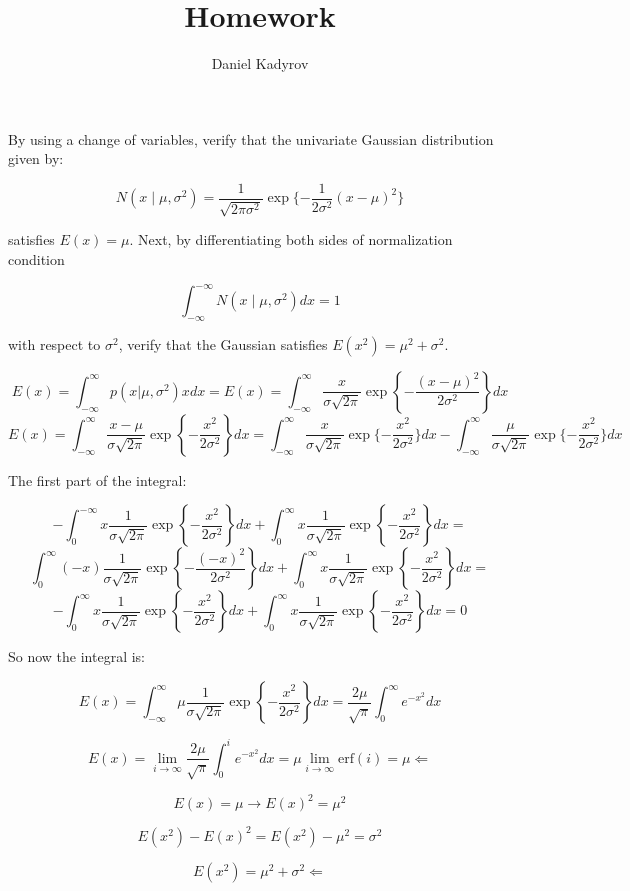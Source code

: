\documentclass{homework}
\title{Homework}
\author{Daniel Kadyrov}
\begin{document}
\maketitle

\begin{problem}[1]
    By using a change of variables, verify that the univariate Gaussian distribution given by:

    $$
    N(x \mid \mu , \sigma^2) = \frac{1}{\sqrt{2\pi\sigma^2}}\exp\{
        -\frac{1}{2\sigma^2}(x-\mu)^2
        \}
    $$

    satisfies $E(x) = \mu$. Next, by differentiating both sides of normalization condition

    $$
    \int_{-\infty}^{-\infty}N(x \mid \mu, \sigma^2) dx = 1
    $$

    with respect to $\sigma^2$, verify that the Gaussian satisfies $E(x^2)=\mu^2+\sigma^2$.
\end{problem}

\begin{solution}
    $$
    E(x) = \int_{-\infty}^{\infty} p(x|\mu, \sigma^2)x dx = E(x) = \int_{-\infty}^{\infty} \frac{x}{\sigma\sqrt{2\pi}}\exp\left\{-\frac{(x-\mu)^2}{2\sigma^2}\right\} dx
    $$
    $$
    E(x) = \int_{-\infty}^{\infty} \frac{x-\mu}{\sigma\sqrt{2\pi}}\exp\left\{-\frac{x^2}{2\sigma^2}\right\} dx = 
    \int_{-\infty}^{\infty} \frac{x}{\sigma\sqrt{2\pi}}\exp\{-\frac{x^2}{2\sigma^2}\} dx -
    \int_{-\infty}^{\infty} \frac{\mu}{\sigma\sqrt{2\pi}}\exp\{-\frac{x^2}{2\sigma^2}\} dx
    $$

    The first part of the integral: 

    $$ 
    -\int_{0}^{-\infty}x\frac{1}{\sigma\sqrt{2\pi}}\exp\left\{-\frac{x^2}{2\sigma^2}\right\}dx + \int_{0}^{\infty}x\frac{1}{\sigma\sqrt{2\pi}}\exp\left\{-\frac{x^2}{2\sigma^2}\right\}dx = 
    $$
    $$\int_{0}^{\infty}(-x)\frac{1}{\sigma\sqrt{2\pi}}\exp\left\{-\frac{(-x)^2}{2\sigma^2}\right\}dx + \int_{0}^{\infty}x\frac{1}{\sigma\sqrt{2\pi}}\exp\left\{-\frac{x^2}{2\sigma^2}\right\}dx =
    $$
    $$
    -\int_{0}^{\infty}x\frac{1}{\sigma\sqrt{2\pi}}\exp\left\{-\frac{x^2}{2\sigma^2}\right\}dx + \int_{0}^{\infty}x\frac{1}{\sigma\sqrt{2\pi}}\exp\left\{-\frac{x^2}{2\sigma^2}\right\}dx = 0
    $$

    So now the integral is: 

    $$
    E(x) = \int_{-\infty}^{\infty}\mu\frac{1}{\sigma\sqrt{2\pi}}\exp\left\{-\frac{x^2}{2\sigma^2}\right\} dx = \frac{2\mu}{\sqrt{\pi}}\int_0^\infty e^{-x^2} dx
    $$

    $$
    E(x) = \lim_{i \to \infty} \frac{2\mu}{\sqrt{\pi}} \int_0^i e^{-x^2} dx  = \mu \lim_{i \to \infty} \text{erf}(i) = \mu \Leftarrow
    $$

    $$
    E(x)=\mu \rightarrow E(x)^2 = \mu^2
    $$

    $$ 
    E(x^2) - E(x)^2 = E(x^2) - \mu^2 = \sigma^2
    $$

    $$ 
    E(x^2) = \mu^2 + \sigma^2 \Leftarrow
    $$


\end{solution}
\end{document}
